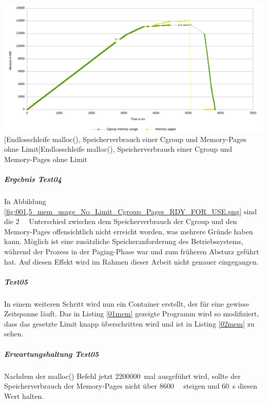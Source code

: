 \vspace{1em}
\begin{minipage}{\linewidth}
	\centering
	\includegraphics[width=1\linewidth]{pics/001,5_mem_usage_No_Limit_Cgroup_Pages_RDY_FOR_USE.png}
	[Endlosschleife malloc(), Speicherverbrauch einer Cgroup und Memory-Pages ohne Limit]{Endlosschleife malloc(), Speicherverbrauch einer Cgroup und Memory-Pages ohne Limit}
	\label{fig:001,5_mem_usage_No_Limit_Cgroup_Pages_RDY_FOR_USE.png}
\end{minipage}

\subparagraph{Ergebnis Test04}
In Abbildung \ref{fig:001,5_mem_usage_No_Limit_Cgroup_Pages_RDY_FOR_USE.png} sind die \SI{2}{\giga\byte} Unterschied zwischen dem Speicherverbrauch der Cgroup und den Memory-Pages offensichtlich nicht erreicht worden, was mehrere Gründe haben kann. Möglich ist eine zusätzliche Speicheranforderung des Betriebssystems, während der Prozess in der Paging-Phase war und zum früheren Absturz geführt hat. Auf diesen Effekt wird im Rahmen dieser Arbeit nicht genauer eingegangen.



\subparagraph{Test05}
In einem weiteren Schritt wird nun ein Container erstellt, der für eine gewisse Zeitspanne läuft. Das in Listing \ref{01mem} gezeigte Programm wird so modifiziert, dass das gesetzte Limit knapp überschritten wird und ist in Listing \ref{02mem} zu sehen. 

\vspace{1em}


\subparagraph{Erwartungshaltung Test05}
Nachdem der malloc() Befehl jetzt \SI{2200000}{mal} ausgeführt wird, sollte der Speicherverbrauch der Memory-Pages nicht über \SI{8600}{\mega\byte} steigen und \SI{60}{\second} diesen Wert halten.



